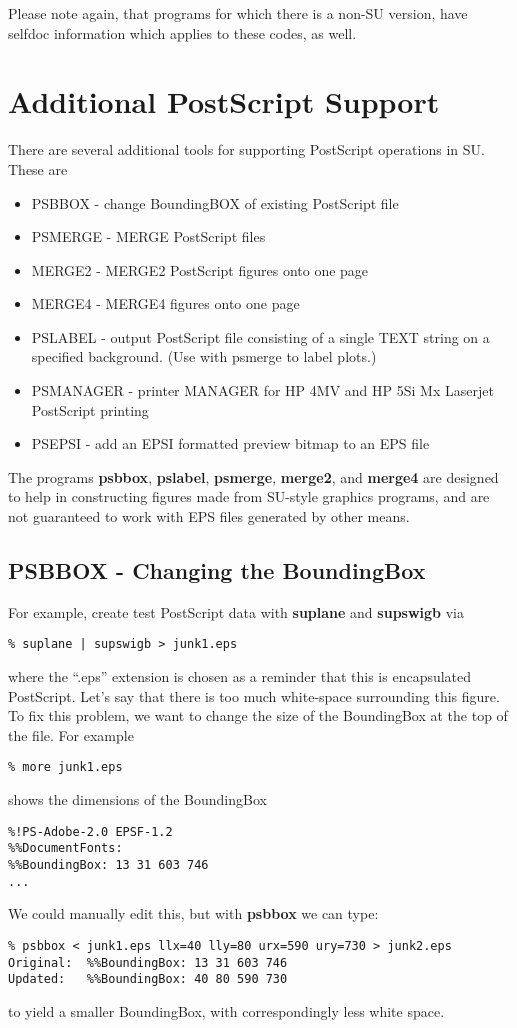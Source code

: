 {{{{{{{Please note again, that programs for which there is a non-SU version,
have selfdoc information which applies to these codes, as well.

\section{Additional PostScript Support}
There are several additional tools for supporting PostScript
operations in SU. These are
\begin{itemize}
\item PSBBOX - change BoundingBOX of existing PostScript file
\item PSMERGE - MERGE PostScript files 
\item MERGE2 - MERGE2 PostScript figures onto one page 
\item MERGE4 - MERGE4 figures onto one page
\item PSLABEL - output PostScript file consisting of a single TEXT string
on a specified background. (Use with psmerge to label plots.)
\item PSMANAGER - printer MANAGER for HP 4MV and HP 5Si Mx Laserjet
PostScript printing 
\item PSEPSI - add an EPSI formatted preview bitmap to an EPS file
\end{itemize}

The programs {\bf psbbox}, {\bf pslabel}, {\bf psmerge}, {\bf merge2},
and {\bf merge4\/} are designed to help in constructing figures
made from SU-style graphics programs, and are not guaranteed to
work with EPS files generated by other means.

\subsection{PSBBOX - Changing the BoundingBox}
For example, create test PostScript data with {\bf suplane\/} and
{\bf supswigb\/} via
{\small\begin{verbatim}
% suplane | supswigb > junk1.eps
\end{verbatim}}\noindent
where the ``.eps'' extension is chosen as a reminder that this is
encapsulated PostScript.
Let's say that there is too much white-space surrounding this figure.
To fix this problem, we want to change the size of the BoundingBox
at the top of the file. For example
{\small\begin{verbatim}
% more junk1.eps
\end{verbatim}}\noindent
shows the dimensions of the BoundingBox
{\small\begin{verbatim}
%!PS-Adobe-2.0 EPSF-1.2
%%DocumentFonts:
%%BoundingBox: 13 31 603 746  
...
\end{verbatim}}\noindent
We could manually edit this, but with {\bf psbbox\/} we can
type:
{\small\begin{verbatim}
% psbbox < junk1.eps llx=40 lly=80 urx=590 ury=730 > junk2.eps
Original:  %%BoundingBox: 13 31 603 746
Updated:   %%BoundingBox: 40 80 590 730 
\end{verbatim}}\noindent
to yield a smaller BoundingBox, with correspondingly less white
space.

}}}}}}}
